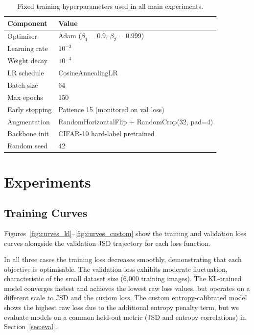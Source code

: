\documentclass[11pt,a4paper]{article}
\begin{document}
\begin{table}[H]
\centering
\caption{Fixed training hyperparameters used in all main experiments.}
\label{tab:training}
\begin{tabular}{ll}
\toprule
\textbf{Component} & \textbf{Value} \\
\midrule
Optimiser              & Adam ($\beta_1=0.9$, $\beta_2=0.999$) \\
Learning rate          & $10^{-3}$ \\
Weight decay           & $10^{-4}$ \\
LR schedule            & CosineAnnealingLR \\
Batch size             & 64 \\
Max epochs             & 150 \\
Early stopping         & Patience 15 (monitored on val loss) \\
Augmentation           & RandomHorizontalFlip + RandomCrop(32, pad=4) \\
Backbone init          & CIFAR-10 hard-label pretrained \\
Random seed            & 42 \\
\bottomrule
\end{tabular}
\end{table}

\section{Experiments}

\subsection{Training Curves}

Figures~\ref{fig:curves_kl}--\ref{fig:curves_custom} show the training and
validation loss curves alongside the validation JSD trajectory for each loss
function.

In all three cases the training loss decreases smoothly, demonstrating that
each objective is optimisable.
The validation loss exhibits moderate fluctuation, characteristic of the
small dataset size (6,000 training images).
The KL-trained model converges fastest and achieves the lowest raw loss
values, but operates on a different scale to JSD and the custom loss.
The custom entropy-calibrated model shows the highest raw loss due to the
additional entropy penalty term, but we evaluate models on a common held-out
metric (JSD and entropy correlations) in Section~\ref{sec:eval}.
\end{document}
